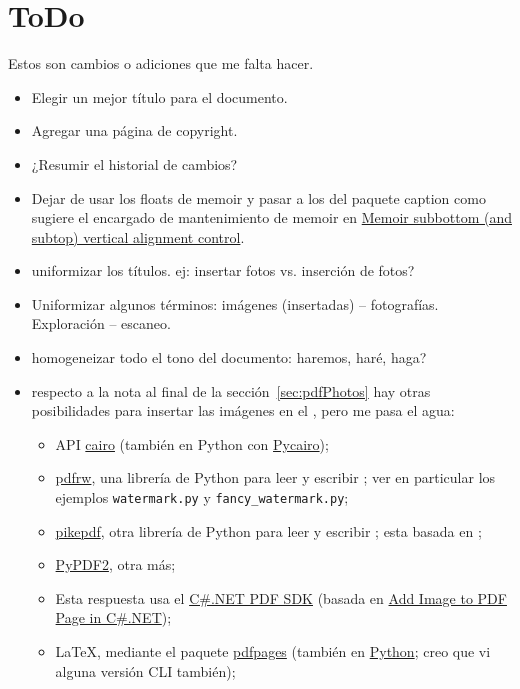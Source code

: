 \documentclass[%
	a5paper,
	10pt,
	twoside,
	openright,
	final,
]{memoir}
\begin{document}
\chapter{ToDo} Estos son cambios o adiciones que me falta hacer.
\begin{itemize}
	\item Elegir un mejor título para el documento.
	\item Agregar una página de copyright.
	\item ¿Resumir el historial de cambios?
	\item Dejar de usar los floats de memoir y pasar a los del paquete caption como sugiere el encargado de mantenimiento de memoir en \href{https://tex.stackexchange.com/questions/524747/memoir-subbottom-and-subtop-vertical-alignment-control}{Memoir subbottom (and subtop) vertical alignment control}.
	\item uniformizar los títulos. ej: insertar fotos vs. inserción de fotos?
	\item Uniformizar algunos términos: imágenes (insertadas) -- fotografías. Exploración -- escaneo.
	\item homogeneizar todo el tono del documento: haremos, haré, haga?
	\item respecto a la nota al final de la sección~\ref{sec:pdfPhotos} hay otras posibilidades para insertar las imágenes en el \pdf, pero me pasa el agua:
		\begin{itemize}[noitemsep]
			\item API \href{cairographics.org}{cairo} (también en Python con \href{https://www.cairographics.org/pycairo/}{Pycairo});
			\item \href{https://github.com/pmaupin/pdfrw}{pdfrw}, una librería de Python para leer y escribir \pdf; ver en particular los ejemplos \texttt{watermark.py} y \texttt{fancy\_watermark.py};
			\item \href{https://github.com/pikepdf/pikepdf}{pikepdf}, otra librería de Python para leer y escribir \pdf; esta basada en \qpdf;
			\item \href{https://github.com/mstamy2/PyPDF2}{PyPDF2}, otra más;
			\item Esta respuesta usa el \href{https://askubuntu.com/a/334463}{C\#.NET PDF SDK} (basada en \href{http://www.rasteredge.com/how-to/csharp-imaging/pdf-add-image/}{Add Image to PDF Page in C\#.NET});
			\item \LaTeX, mediante el paquete \href{https://www.ctan.org/pkg/pdfpages}{pdfpages} (también en \href{https://pypi.org/project/pdfpages/}{Python}; creo que vi alguna versión CLI también);

\end{itemize}
\end{itemize}
\end{document}
